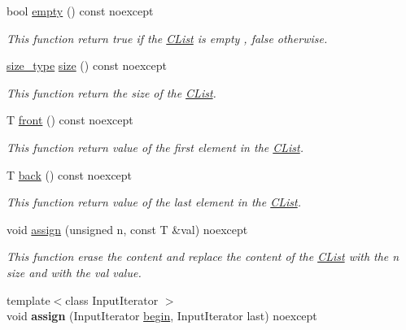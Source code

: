 \begin{DoxyCompactItemize}
bool \hyperlink{classnsSdD_1_1CList_ad9c0ecbdedb0a8ad28625874f3c11c4d}{empty} () const noexcept
\begin{DoxyCompactList}\small\item\em This function return true if the \hyperlink{classnsSdD_1_1CList}{C\+List} is empty , false otherwise. \end{DoxyCompactList}\item 
\hyperlink{classnsSdD_1_1CList_a91d4b6b8c89816da277ee27d32df5478}{size\+\_\+type} \hyperlink{classnsSdD_1_1CList_a108494f68c871f0f1e0a337cfe93ab36}{size} () const noexcept
\begin{DoxyCompactList}\small\item\em This function return the size of the \hyperlink{classnsSdD_1_1CList}{C\+List}. \end{DoxyCompactList}\item 
T \hyperlink{classnsSdD_1_1CList_a2666d99b91b6bf301d3f9a980200c5df}{front} () const noexcept
\begin{DoxyCompactList}\small\item\em This function return value of the first element in the \hyperlink{classnsSdD_1_1CList}{C\+List}. \end{DoxyCompactList}\item 
T \hyperlink{classnsSdD_1_1CList_ab85483872c2daff13f17bdf3327ce7c0}{back} () const noexcept
\begin{DoxyCompactList}\small\item\em This function return value of the last element in the \hyperlink{classnsSdD_1_1CList}{C\+List}. \end{DoxyCompactList}\item 
void \hyperlink{classnsSdD_1_1CList_a27b48887bd136140f3f79192b79f8897}{assign} (unsigned n, const T \&val) noexcept
\begin{DoxyCompactList}\small\item\em This function erase the content and replace the content of the \hyperlink{classnsSdD_1_1CList}{C\+List} with the {\ttfamily n} size and with the {\ttfamily val} value. \end{DoxyCompactList}\item 
\hypertarget{classnsSdD_1_1CList_a11db16b0200f115876884342e232d8b4}{{\footnotesize template$<$class Input\+Iterator $>$ }\\void {\bfseries assign} (Input\+Iterator \hyperlink{classnsSdD_1_1CList_aa388b52d241c12737c4e5b2a36c767c3}{begin}, Input\+Iterator last) noexcept}\label{classnsSdD_1_1CList_a11db16b0200f115876884342e232d8b4}


\end{DoxyCompactItemize}
